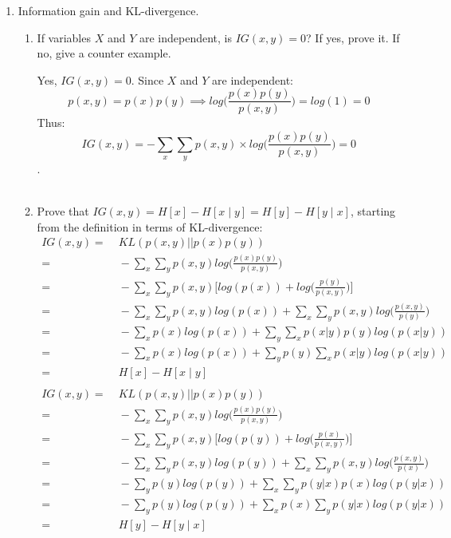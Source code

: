 \begin{enumerate}
\item Information gain and KL-divergence.
\begin{enumerate}
	\item If variables $X$ and $Y$ are independent, is $IG(x,y) = 0$? If yes, prove it. If no, give a counter example.
	
	
	Yes, $IG(x,y) = 0$. Since $X$ and $Y$ are independent: 
	$$p(x, y) = p(x)p(y) \implies log\bigg(\frac{p(x)p(y)}{p(x,y)}\bigg)=log(1)=0$$
	Thus:
	$$IG(x, y)=-\sum_{x}\sum_{y}p(x, y) \times log\bigg(\frac{p(x)p(y)}{p(x,y)}\bigg)=0$$.\\
	\\
	\newpage
	\item Prove that $IG(x,y) = H[x] - H[x \mid y] = H[y] - H[y \mid x]$,
	starting from the definition in terms of KL-divergence:
	\begin{align*}
	IG(x,y) =&\; KL\left(p(x,y)||p(x)p(y)\right) \\
	=&\; -\sum_x\sum_yp(x, y)log\bigg(\frac{p(x)p(y)}{p(x,y)}\bigg)\\
	=&\; -\sum_x\sum_yp(x, y)\bigg[log(p(x))+log\bigg(\frac{p(y)}{p(x,y)}\bigg)\bigg]\\
	=&\; -\sum_x\sum_yp(x,y)log(p(x)) + \sum_x\sum_yp(x, y)log\bigg(\frac{p(x,y)}{p(y)}\bigg)\\
	=&\; -\sum_xp(x)log(p(x)) + \sum_y\sum_xp(x|y)p(y)log(p(x|y))\\
	=&\; -\sum_xp(x)log(p(x)) + \sum_yp(y)\sum_xp(x|y)log(p(x|y))\\
	=&\; H[x] - H[x \mid y]\\
	\end{align*}
	\begin{align*}
	IG(x,y) =&\; KL\left(p(x,y)||p(x)p(y)\right) \\
	=&\; -\sum_x\sum_yp(x, y)log\bigg(\frac{p(x)p(y)}{p(x,y)}\bigg)\\
	=&\; -\sum_x\sum_yp(x, y)\bigg[log(p(y))+log\bigg(\frac{p(x)}{p(x,y)}\bigg)\bigg]\\
	=&\; -\sum_x\sum_yp(x,y)log(p(y)) + \sum_x\sum_yp(x, y)log\bigg(\frac{p(x,y)}{p(x)}\bigg)\\
	=&\; -\sum_yp(y)log(p(y)) + \sum_x\sum_yp(y|x)p(x)log(p(y|x))\\
	=&\; -\sum_yp(y)log(p(y)) + \sum_xp(x)\sum_yp(y|x)log(p(y|x))\\
	=&\; H[y] - H[y \mid x]
	\end{align*}
\end{enumerate}

\end{enumerate}
